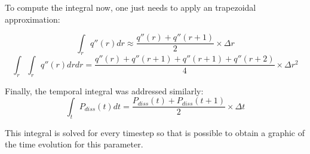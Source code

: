 \par To compute the integral now, one just needs to apply an trapezoidal approximation:

\begin{equation}
\int_r q''(r) dr \approx \frac{q''(r)+q''(r+1)}{2} \times \Delta r
\end{equation}
\begin{equation}
\int_r \int_r q''(r) dr dr = \frac{q''(r)+ q''(r+1) + q''(r+1)+q''(r+2)}{4} \times \Delta r^2
\end{equation}

\par Finally, the temporal integral was addressed similarly:
\begin{equation}
\int_t P_{diss}(t) dt = \frac{P_{diss}(t)+ P_{diss}(t+1)}{2} \times \Delta t
\end{equation}
\par This integral is solved for every timestep so that is possible to obtain a graphic of the time evolution for this parameter.
